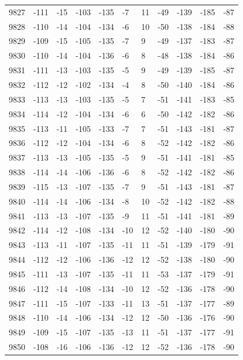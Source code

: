 \begin{table}[H]
\begin{tabular}{lllllllllll}
9827 & -111 & -15 & -103 & -135 & -7 & 11 & -49 & -139 & -185 & -87 \\
9828 & -110 & -14 & -104 & -134 & -6 & 10 & -50 & -138 & -184 & -88 \\
9829 & -109 & -15 & -105 & -135 & -7 & 9 & -49 & -137 & -183 & -87 \\
9830 & -110 & -14 & -104 & -136 & -6 & 8 & -48 & -138 & -184 & -86 \\
9831 & -111 & -13 & -103 & -135 & -5 & 9 & -49 & -139 & -185 & -87 \\
9832 & -112 & -12 & -102 & -134 & -4 & 8 & -50 & -140 & -184 & -86 \\
9833 & -113 & -13 & -103 & -135 & -5 & 7 & -51 & -141 & -183 & -85 \\
9834 & -114 & -12 & -104 & -134 & -6 & 6 & -50 & -142 & -182 & -86 \\
9835 & -113 & -11 & -105 & -133 & -7 & 7 & -51 & -143 & -181 & -87 \\
9836 & -112 & -12 & -104 & -134 & -6 & 8 & -52 & -142 & -182 & -86 \\
9837 & -113 & -13 & -105 & -135 & -5 & 9 & -51 & -141 & -181 & -85 \\
9838 & -114 & -14 & -106 & -136 & -6 & 8 & -52 & -142 & -182 & -86 \\
9839 & -115 & -13 & -107 & -135 & -7 & 9 & -51 & -143 & -181 & -87 \\
9840 & -114 & -14 & -106 & -134 & -8 & 10 & -52 & -142 & -182 & -88 \\
9841 & -113 & -13 & -107 & -135 & -9 & 11 & -51 & -141 & -181 & -89 \\
9842 & -114 & -12 & -108 & -134 & -10 & 12 & -52 & -140 & -180 & -90 \\
9843 & -113 & -11 & -107 & -135 & -11 & 11 & -51 & -139 & -179 & -91 \\
9844 & -112 & -12 & -106 & -136 & -12 & 12 & -52 & -138 & -180 & -90 \\
9845 & -111 & -13 & -107 & -135 & -11 & 11 & -53 & -137 & -179 & -91 \\
9846 & -112 & -14 & -108 & -134 & -10 & 12 & -52 & -136 & -178 & -90 \\
9847 & -111 & -15 & -107 & -133 & -11 & 13 & -51 & -137 & -177 & -89 \\
9848 & -110 & -14 & -106 & -134 & -12 & 12 & -50 & -136 & -176 & -90 \\
9849 & -109 & -15 & -107 & -135 & -13 & 11 & -51 & -137 & -177 & -91 \\
9850 & -108 & -16 & -106 & -136 & -12 & 12 & -52 & -136 & -178 & -90 \\

\end{tabular}
\end{table}
